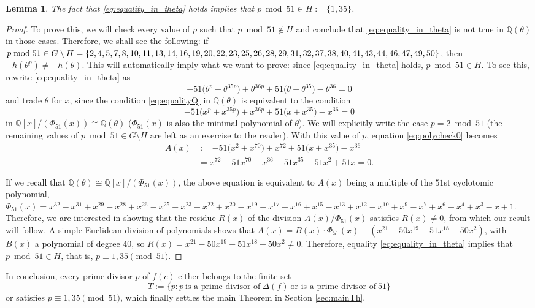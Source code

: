 \documentclass[a4paper, 12pt]{article}
\newtheorem{lemma}[theorem]{Lemma}
\theoremstyle{definition}
\newcommand{\Q}{\ensuremath{\mathbb{Q}}}
\newcommand{\splitatcommas}[1]{%
  \begingroup
  \begingroup\lccode`~=`, \lowercase{\endgroup
    \edef~{\mathchar\the\mathcode`, \penalty0 \noexpand\hspace{0pt plus 1em}}%
  }\mathcode`,="8000 #1%
  \endgroup
}%
\begin{document}
\begin{lemma}
The fact that \eqref{eq:equality_in_theta} holds implies that $p \bmod{51}\in H:=\{1,35\}$.
\end{lemma}
\begin{proof}
To prove this, we will check every value of $p$ such that $p \bmod{51}\notin H$ and conclude that \eqref{eq:equality_in_theta} is not true in $\Q(\theta)$ in those cases. Therefore, we shall see the following: if $p \bmod{51}\in G\setminus H=\splitatcommas{\{2, 4, 5, 7, 8, 10, 11, 13, 14, 16, 19, 20, 22, 23, 25, 26, 28, 29, 31, 32, 37, 38, 40, 41, 43, 44, 46, 47, 49, 50\}}$, then $-h(\theta^p)\neq -h(\theta)$. This will automatically imply what we want to prove: since \eqref{eq:equality_in_theta} holds, $p \bmod{51}\in H$. To see this, rewrite \eqref{eq:equality_in_theta} as
\begin{equation}\label{eq:equalityQ}
-51\big(\theta^{p}+\theta^{35p}\big)+\theta^{36p}+51\big(\theta+\theta^{35}\big)-\theta^{36}=0
\end{equation}
and trade $\theta$ for $x$, since the condition \eqref{eq:equalityQ} in $\Q(\theta)$ is equivalent to the condition
\begin{equation}\label{eq:polycheck0}
-51\big(x^p+x^{35p}\big)+x^{36p}+51\big(x+x^{35}\big)-x^{36}=0
\end{equation}
in $\Q[x]/(\Phi_{51}(x))\cong\Q(\theta)$ ($\Phi_{51}(x)$ is also the minimal polynomial of $\theta$). We will explicitly write the case $p=2 \bmod{51}$ (the remaining values of $p \bmod{51}\in G\setminus H$ are left as an exercise to the reader). With this value of $p$, equation \eqref{eq:polycheck0} becomes
\begin{align*}
A(x)&:=-51\big(x^{2}+x^{70}\big)+x^{72}+51\big(x+x^{35}\big)-x^{36}\\
&=x^{72} - 51 x^{70} - x^{36} + 51 x^{35} - 51 x^{2} + 51 x=0.
\end{align*}

If we recall that $\Q(\theta)\cong\Q[x]/(\Phi_{51}(x))$, the above equation is equivalent to $A(x)$ being a multiple of the $51$st cyclotomic polynomial, $\Phi_{51}(x) = x^{32} - x^{31} + x^{29} - x^{28} + x^{26} - x^{25} + x^{23} - x^{22} + x^{20} - x^{19} + x^{17} - x^{16} + x^{15} - x^{13} + x^{12} - x^{10} + x^{9} - x^{7} + x^{6} - x^{4} + x^{3} - x + 1$. Therefore, we are interested in showing that the residue $R(x)$ of the division $A(x)/\Phi_{51}(x)$ satisfies $R(x)\neq 0$, from which our result will follow. A simple Euclidean division of polynomials shows that $A(x)=B(x)\cdot\Phi_{51}(x)+(x^{21} - 50 x^{19} - 51 x^{18} - 50 x^{2})$, with $B(x)$ a polynomial of degree $40$, so $R(x)=x^{21} - 50 x^{19} - 51 x^{18} - 50 x^{2} \neq 0$. Therefore, equality \eqref{eq:equality_in_theta} implies that $p \bmod{51} \in H$, that is, $p\equiv 1,35\pmod{51}$.
\end{proof}

In conclusion, every prime divisor $p$ of $f(c)$ either belongs to the finite set 
\begin{equation*}
T:=\{p: p \ \text{is a prime divisor of} \ \Delta(f) \ \text{or is a prime divisor of} \ 51\}
\end{equation*}
or satisfies $p\equiv 1,35\pmod{51}$, which finally settles the main Theorem in Section \ref{sec:mainTh}. 
\end{document}
